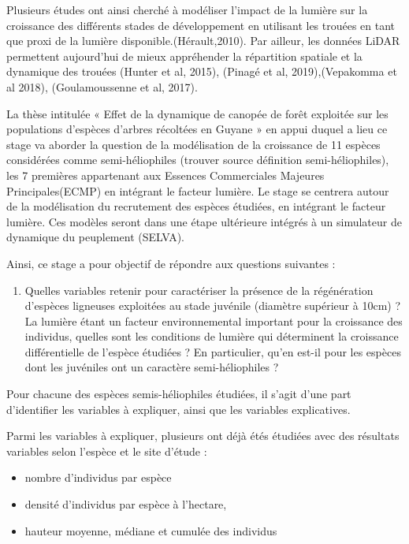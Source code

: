 \documentclass[
  12pt,
  american,
  a4paper,
  extrafontsizes,onecolumn,openright
  ]{memoir}
\providecommand{\tightlist}{%
  \setlength{\itemsep}{0pt}\setlength{\parskip}{0pt}}
\begin{document}
Plusieurs études ont ainsi cherché à modéliser l'impact de la lumière sur la croissance des différents stades de développement en utilisant les trouées en tant que proxi de la lumière disponible.(Hérault,2010). Par ailleur, les données LiDAR permettent aujourd'hui de mieux appréhender la répartition spatiale et la dynamique des trouées (Hunter et al, 2015), (Pinagé et al, 2019),(Vepakomma et al 2018), (Goulamoussenne et al, 2017).

La thèse intitulée « Effet de la dynamique de canopée de forêt exploitée sur les populations d'espèces d'arbres récoltées en Guyane » en appui duquel a lieu ce stage va aborder la question de la modélisation de la croissance de 11 espèces considérées comme semi-héliophiles (trouver source définition semi-héliophiles), les 7 premières appartenant aux Essences Commerciales Majeures Principales(ECMP) en intégrant le facteur lumière. Le stage se centrera autour de la modélisation du recrutement des espèces étudiées, en intégrant le facteur lumière. Ces modèles seront dans une étape ultérieure intégrés à un simulateur de dynamique du peuplement (SELVA).

Ainsi, ce stage a pour objectif de répondre aux questions suivantes :

\begin{enumerate}
\def\labelenumi{\arabic{enumi})}
\tightlist
\item
  Quelles variables retenir pour caractériser la présence de la régénération d'espèces ligneuses exploitées au stade juvénile (diamètre supérieur à 10cm) ?
  La lumière étant un facteur environnemental important pour la croissance des individus, quelles sont les conditions de lumière qui déterminent la croissance différentielle de l'espèce étudiées ?
  En particulier, qu'en est-il pour les espèces dont les juvéniles ont un caractère semi-héliophiles ?
\end{enumerate}

Pour chacune des espèces semis-héliophiles étudiées, il s'agit d'une part d'identifier les variables à expliquer, ainsi que les variables explicatives.

Parmi les variables à expliquer, plusieurs ont déjà étés étudiées avec des résultats variables selon l'espèce et le site d'étude :

\begin{itemize}
\item
  nombre d'individus par espèce
\item
  densité d'individus par espèce à l'hectare,
\item
  hauteur moyenne, médiane et cumulée des individus
\end{itemize}
\end{document}
